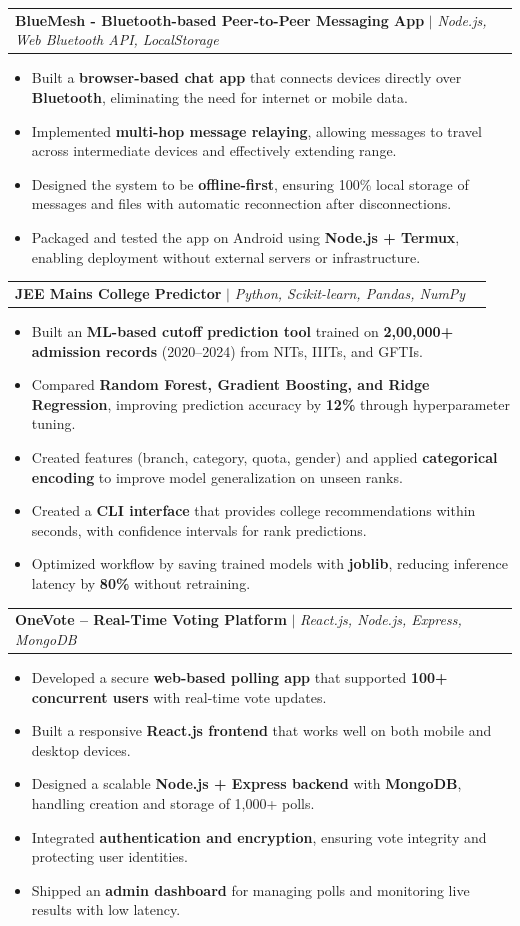 \documentclass[a4paper,11pt]{article}
\makeatletter
\newcommand{\resumeItem}[1]{
  \item\small{
    {#1 \vspace{-2pt}}
  }
}
\newcommand{\resumeProjectHeading}[2]{
    \item
    \begin{tabular*}{1.001\textwidth}{l@{\extracolsep{\fill}}r}
      \small#1 & \textbf{\small #2}\\
    \end{tabular*}\vspace{-7pt}
}
\newcommand{\resumeItemListStart}{\begin{itemize}}
\newcommand{\resumeItemListEnd}{\end{itemize}\vspace{-5pt}}
\makeatother
\begin{document}
\resumeProjectHeading{\textbf{BlueMesh - Bluetooth-based Peer-to-Peer Messaging App} $|$ \emph{Node.js, Web Bluetooth API, LocalStorage}}{}
\resumeItemListStart
  \resumeItem{Built a \textbf{browser-based chat app} that connects devices directly over \textbf{Bluetooth}, eliminating the need for internet or mobile data.}
  \resumeItem{Implemented \textbf{multi-hop message relaying}, allowing messages to travel across intermediate devices and effectively extending range.}
  \resumeItem{Designed the system to be \textbf{offline-first}, ensuring 100\% local storage of messages and files with automatic reconnection after disconnections.}
  \resumeItem{Packaged and tested the app on Android using \textbf{Node.js + Termux}, enabling deployment without external servers or infrastructure.}
\resumeItemListEnd
\vspace{-16pt}

\resumeProjectHeading{\textbf{JEE Mains College Predictor} $|$ \emph{Python, Scikit-learn, Pandas, NumPy}}{}
\resumeItemListStart
  \resumeItem{Built an \textbf{ML-based cutoff prediction tool} trained on \textbf{2,00,000+ admission records} (2020–2024) from NITs, IIITs, and GFTIs.}
  \resumeItem{Compared \textbf{Random Forest, Gradient Boosting, and Ridge Regression}, improving prediction accuracy by \textbf{12\%} through hyperparameter tuning.}
  \resumeItem{Created features (branch, category, quota, gender) and applied \textbf{categorical encoding} to improve model generalization on unseen ranks.}
  \resumeItem{Created a \textbf{CLI interface} that provides college recommendations within seconds, with confidence intervals for rank predictions.}
  \resumeItem{Optimized workflow by saving trained models with \textbf{joblib}, reducing inference latency by \textbf{80\%} without retraining.}
\resumeItemListEnd
\vspace{-26pt}

\resumeProjectHeading{\textbf{OneVote – Real-Time Voting Platform} $|$ \emph{React.js, Node.js, Express, MongoDB}}{}
\resumeItemListStart
  \resumeItem{Developed a secure \textbf{web-based polling app} that supported \textbf{100+ concurrent users} with real-time vote updates.}
  \resumeItem{Built a responsive \textbf{React.js frontend} that works well on both mobile and desktop devices.}
  \resumeItem{Designed a scalable \textbf{Node.js + Express backend} with \textbf{MongoDB}, handling creation and storage of 1,000+ polls.}
  \resumeItem{Integrated \textbf{authentication and encryption}, ensuring vote integrity and protecting user identities.}
  \resumeItem{Shipped an \textbf{admin dashboard} for managing polls and monitoring live results with low latency.}
\resumeItemListEnd
\vspace{-16pt}
\end{document}
